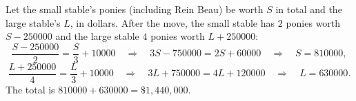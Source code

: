 Let the small stable's ponies (including Rein Beau) be worth $S$ in total and the large stable's $L$, in dollars. After the move, the small stable has $2$ ponies worth $S-250000$ and the large stable $4$ ponies worth $L+250000$:
\[
\dfrac{S-250000}{2}=\dfrac {S}{3}+10000\quad\Longrightarrow\quad 3S-750000=2S+60000\quad\Longrightarrow\quad S=810000,
\]
\[
\dfrac{L+250000}{4}=\dfrac {L}{3}+10000\quad\Longrightarrow\quad 3L+750000=4L+120000\quad\Longrightarrow\quad L=630000 .
\]
The total is $810000+630000=\boxed{\$1{,}440{,}000}$.
